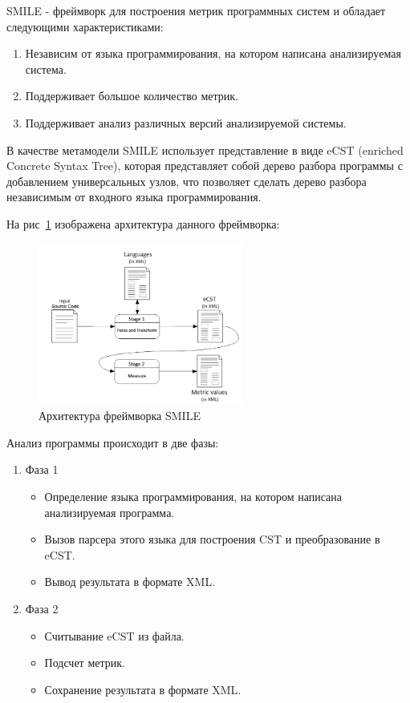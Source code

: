 SMILE - фреймворк для построения метрик программных систем и обладает следующими
характеристиками:

\begin{enumerate}
    \item Независим от языка программирования, на котором написана анализируемая
    система.
    \item Поддерживает большое количество метрик.
    \item Поддерживает анализ различных версий анализируемой системы.
\end{enumerate}

В качестве метамодели SMILE использует представление в виде eCST (enriched
Concrete Syntax Tree), которая представляет собой дерево разбора программы с
добавлением универсальных узлов, что позволяет сделать дерево разбора
независимым от входного языка программирования.

На рис~\ref{fig:smile_arch} изображена архитектура данного фреймворка:

\begin{figure}[h!]
    \begin{center}
        \includegraphics[width=0.6\textwidth]{img/smile_arch.png}
    \end{center}
    \caption{Архитектура фреймворка SMILE}
    \label{fig:smile_arch}
\end{figure}

\newpage
Анализ программы происходит в две фазы:

\begin{enumerate}
    \item Фаза 1
    \begin{itemize}
        \item Определение языка программирования, на котором написана
        анализируемая программа.
        \item Вызов парсера этого языка для построения CST и преобразование в
        eCST.
        \item Вывод результата в формате XML.
    \end{itemize}

    \item Фаза 2
    \begin{itemize}
        \item Считывание eCST из файла.
        \item Подсчет метрик.
        \item Сохранение результата в формате XML.
    \end{itemize}
\end{enumerate}

